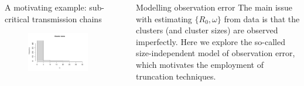 \documentclass[final]{beamer}
\newcommand{\disp}{\omega}					%
\newlength{\sepwidth}
\newlength{\colwidth}
\newcommand{\separatorcolumn}{\begin{column}{\sepwidth}\end{column}}
\begin{document}
\begin{frame}[t]
\begin{columns}[t]
\begin{column}{\colwidth}
\begin{block}{A motivating example: sub-critical transmission chains}
\begin{figure}[t!]
\begin{center}
\includegraphics[scale=1.25]{cluster_sizes.pdf}
\end{center}
\end{figure}
  
  \end{block}
  \end{column}

  \separatorcolumn

  \begin{column}{\colwidth}

  \begin{block}{Modelling observation error}
    The main issue with estimating $\{R_0, \disp\}$ from data is that the clusters (and cluster sizes) are observed imperfectly.
    Here we explore the so-called size-independent model of observation error, which motivates the employment of truncation techniques.


\end{block}
\end{column}
\end{columns}
\end{frame}
\end{document}
